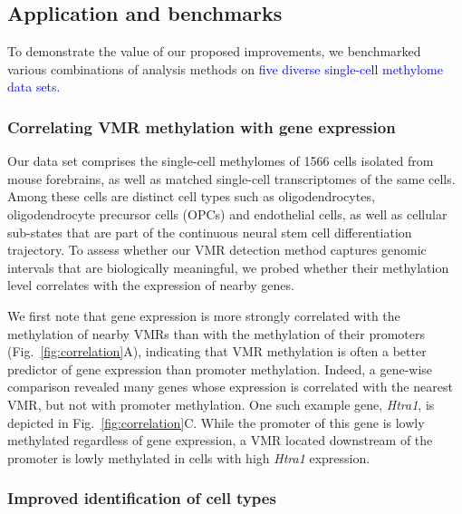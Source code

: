 \documentclass[twocolumn,10pt]{article}
\newcommand{\new}[1]{\textcolor{blue}{#1}}
\begin{document}
\subsection{Application and benchmarks}

To demonstrate the value of our proposed improvements, we benchmarked various combinations of analysis methods on \new{five diverse single-cell methylome data sets.}

\subsubsection{Correlating VMR methylation with gene expression}

Our data set \citep{kremer_scnmt} comprises the single-cell methylomes of 1566 cells isolated from mouse forebrains, as well as matched single-cell transcriptomes of the same cells.
Among these cells are distinct cell types such as oligodendrocytes, oligodendrocyte precursor cells (OPCs) and endothelial cells, as well as cellular sub-states that are part of the continuous neural stem cell differentiation trajectory.
To assess whether our VMR detection method captures genomic intervals that are biologically meaningful, we probed whether their methylation level correlates with the expression of nearby genes.

We first note that gene expression is more strongly correlated with the methylation of nearby VMRs than with the methylation of their promoters (Fig.~\ref{fig:correlation}A), indicating that VMR methylation is often a better predictor of gene expression than promoter methylation.
Indeed, a gene-wise comparison revealed many genes whose expression is correlated with the nearest VMR, but not with promoter methylation.
One such example gene, \textit{Htra1}, is depicted in Fig.~\ref{fig:correlation}C.
While the promoter of this gene is lowly methylated regardless of gene expression, a VMR located downstream of the promoter is lowly methylated in cells with high \textit{Htra1} expression.

\subsubsection{Improved identification of cell types}
\end{document}
